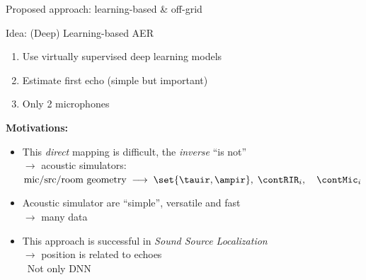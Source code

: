 \begin{frame}{Proposed approach: learning-based \& off-grid \hfill\faProjectDiagram}

    \begin{mydefblock}{Idea: (Deep) Learning-based AER}
        \begin{enumerate}
            \item Use \alert{virtually} supervised deep learning models
            \item Estimate first echo (simple but important)
            \\
            \item Only 2 microphones
        \end{enumerate}
    \end{mydefblock}

    \vfill
    \textbf{Motivations:}
    \begin{itemize}
        \item This \textit{direct} mapping is difficult, the \textit{inverse} ``is not''
        \\$\rightarrow$ acoustic simulators:
            $\text{mic/src/room geometry}
            \; \longrightarrow \;
            \set{\tauir,\ampir}, \; \contRIR_i, \quad \contMic_i$
        \item Acoustic simulator are ``simple'', versatile and fast
        \\$\to$ many data
        \item This approach is successful in \textit{Sound Source Localization}
        \\$\to$ position is related to echoes
        \\{\small\cite{kataria2017hearing,nguyen2018autonomous,perotin2019regression} \textcolor{myred}{\faExclamationTriangle~Not only DNN}}
    \end{itemize}

\end{frame}

